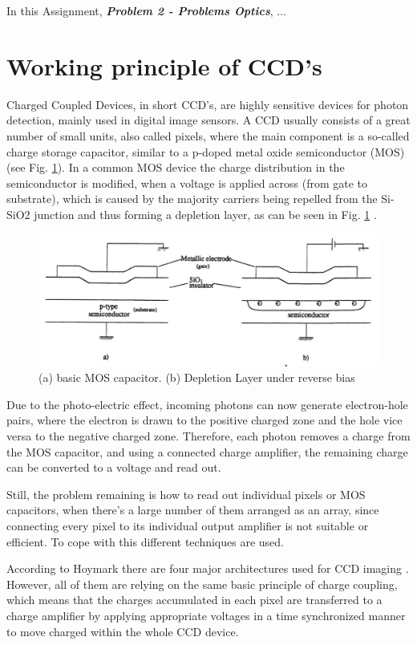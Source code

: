 

In this Assignment, \textit{\textbf{Problem 2 - Problems Optics}}, ...


\section{Working principle of CCD's}
Charged Coupled Devices, in short CCD's, are highly sensitive devices for photon detection, mainly used in digital image sensors. A CCD usually consists of a great number of small units, also called pixels, where the main component is a so-called charge storage capacitor, similar to a p-doped metal oxide semiconductor (MOS) (see Fig. \ref{fig:mos}).
In a common MOS device the charge distribution in the semiconductor is modified, when a voltage is applied across  (from gate to substrate), which is caused by the majority carriers being repelled from the Si-SiO2 junction and thus forming a depletion layer, as can be seen in Fig. \ref{fig:mos} \citep[c.f.][chap. 6.8.1]{hoymorksensors}.

\begin{figure}[!htbp]
	\centering
	\includegraphics[width=\linewidth]{images/mos}
		\caption{(a) basic MOS capacitor. (b) Depletion Layer under reverse bias \citep[c.f.][fig. 6.20]{hoymorksensors} }
		 \label{fig:mos}
\end{figure}

Due to the photo-electric effect, incoming photons can now generate electron-hole pairs, where the electron is drawn to the positive charged zone and the hole vice versa to the negative charged zone. Therefore, each photon removes a charge from the MOS capacitor, and using a connected charge amplifier, the remaining charge can be converted to a voltage and read out.

 Still, the problem remaining is how to read out individual pixels or MOS capacitors, when there's a large number of them arranged as an array, since connecting every pixel to its individual output amplifier is not suitable or efficient. To cope with this different techniques are used. \par
 According to Hoymark there are four major architectures used for CCD imaging \citep{hoymorksensors}. However, all of them are relying on the same basic principle of charge coupling, which means that the charges accumulated in each pixel are transferred to a charge amplifier by applying appropriate voltages in a time synchronized manner to move charged within the whole CCD device.
 
